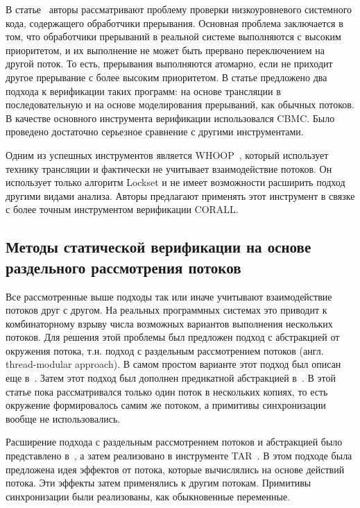 В статье~\cite{Liang:2017} авторы рассматривают проблему проверки низкоуровневого системного кода, содержащего обработчики прерывания.
Основная проблема заключается в том, что обработчики прерываний в реальной системе выполняются с высоким приоритетом, и их выполнение не может быть прервано переключением на другой поток.
То есть, прерывания выполняются атомарно, если не приходит другое прерывание с более высоким приоритетом.
В статье предложено два подхода к верификации таких программ: на основе трансляции в последовательную и на основе моделирования прерываний, как обычных потоков.
В качестве основного инструмента верификации использовался CBMC.
Было проведено достаточно серьезное сравнение с другими инструментами.

Одним из успешных инструментов является WHOOP~\cite{WHOOP}, который использует технику трансляции и фактически не учитывает взаимодействие потоков.
Он использует только алгоритм Lockset и не имеет возможности расширить подход другими видами анализа.
Авторы предлагают применять этот инструмент в связке с более точным инструментом верификации CORALL. 

\subsection{Методы статической верификации на основе раздельного рассмотрения потоков}

Все рассмотренные выше подходы так или иначе учитывают взаимодействие потоков друг с другом. 
На реальных программных системах это приводит к комбинаторному взрыву числа возможных вариантов выполнения нескольких потоков.
Для решения этой проблемы был предложен подход с абстракцией от окружения потока, т.н. подход с раздельным рассмотрением потоков (англ. thread-modular approach). 
В самом простом варианте этот подход был описан еще в~\cite{ThreadModular03}.
Затем этот подход был дополнен предикатной абстракцией в~\cite{Henzinger:2004}.
В этой статье пока рассматривался только один поток в нескольких копиях, то есть окружение формировалось самим же потоком, а примитивы синхронизации вообще не использовались.

Расширение подхода с раздельным рассмотрением потоков и абстракцией было представлено в~\cite{Malkis:2006}, а затем реализовано в инструменте TAR~\cite{TAR}.
В этом подходе была предложена идея эффектов от потока, которые вычислялись на основе действий потока.
Эти эффекты затем применялись к другим потокам.
Примитивы синхронизации были реализованы, как обыкновенные переменные.

